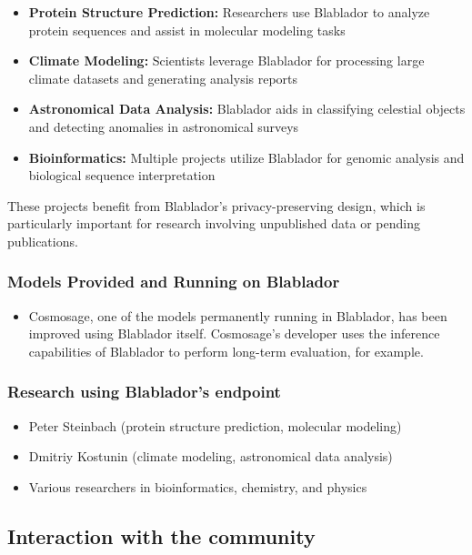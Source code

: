 \documentclass[10pt,conference]{IEEEtran}
\begin{document}
\begin{itemize}
    \item \textbf{Protein Structure Prediction:} Researchers use Blablador to analyze protein sequences and assist in molecular modeling tasks
    \item \textbf{Climate Modeling:} Scientists leverage Blablador for processing large climate datasets and generating analysis reports
    \item \textbf{Astronomical Data Analysis:} Blablador aids in classifying celestial objects and detecting anomalies in astronomical surveys
    \item \textbf{Bioinformatics:} Multiple projects utilize Blablador for genomic analysis and biological sequence interpretation
\end{itemize}

These projects benefit from Blablador's privacy-preserving design, which is particularly important for research involving unpublished data or pending publications.

\subsubsection{Models Provided and Running on Blablador}
\begin{itemize}
    \item Cosmosage, one of the models permanently running in Blablador, has been improved using Blablador itself. Cosmosage's developer uses the inference capabilities of Blablador to perform long-term evaluation, for example.
\end{itemize}

\subsubsection{Research using Blablador's endpoint}
\begin{itemize}
    \item Peter Steinbach (protein structure prediction, molecular modeling)
    \item Dmitriy Kostunin (climate modeling, astronomical data analysis)
    \item Various researchers in bioinformatics, chemistry, and physics
\end{itemize}



\subsection{Interaction with the community}
\end{document}
